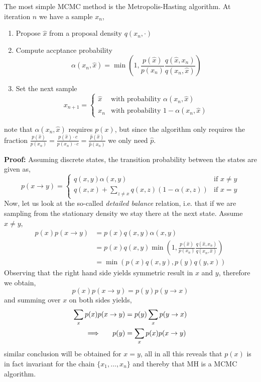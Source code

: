 \begin{testexample}
    The most simple MCMC method is the Metropolis-Hasting algorithm. At iteration
    $n$ we have a sample $x_n$,
    \begin{enumerate}
        \item Propose $\hat x$ from a proposal density $q(x_n,\cdot)$
        \item Compute accptance probability $$\alpha(x_n,\hat x) = \min \left(1, \frac{p(\hat x)}{p(x_n)} \frac{q(\hat x, x_n)}{q(x_n,\hat x)}\right)$$
        \item Set the next sample $$x_{n+1} = \begin{cases}
            \hat x &\text{with probability } \alpha(x_n, \hat x)\\
             x_n &\text{with probability } 1-\alpha(x_n, \hat x)
        \end{cases}$$
    \end{enumerate}
    note that $\alpha(x_n,\hat x)$ requires $p(x)$, but since the algorithm only
    requires the fraction $\frac{p(\hat x)}{p(x_n)} = \frac{p(\hat x)\cdot c}{p(x_n)\cdot c} = \frac{\hat p(\hat x)}{\hat p(x_n)}$
    we only need $\hat p$. 
    
    \textbf{Proof:} Assuming discrete states, the transition probability between the states are given as, 
    $$p(x\rightarrow y) = \begin{cases}
        q(x,y)\alpha(x,y) & \text{if } x\neq y\\
        q(x,x) + \sum_{z\neq x} q(x,z)(1-\alpha(x,z)) & \text{if } x=y
    \end{cases}$$
    Now, let us look at the so-called \textit{detailed balance} relation, i.e. that if we are sampling from the
    stationary density we stay there at the next state. Assume $x\neq y$, 
    \begin{align*}
        p(x)p(x\rightarrow y) &= p(x)q(x,y)\alpha(x,y)\\
        &=p(x)q(x,y) \min \left(1, \frac{p(\hat x)}{p(x_n)} \frac{q(\hat x, x_n)}{q(x_n,\hat x)}\right)\\
        &= \min(p(x)q(x,y), p(y)q(y,x))
    \end{align*}
    Observing that the right hand side yields symmetric result in $x$ and $y$, therefore we obtain, 
    $$p(x)p(x\rightarrow y) = p(y)p(y\rightarrow x)$$
    and summing over $x$ on both sides yields,
    \begin{align}
        \sum_x p(x)p(x\rightarrow y) &= p(y) \sum_x p(y\rightarrow x)\\
        \implies \hspace{0.5cm} p(y) &= \sum_x p(x)p(x\rightarrow y)
    \end{align}
    similar conclusion will be obtained for $x = y$, all in all this reveals that $p(x)$ is in fact invariant for the chain
     $\{x_1, \dots , x_n\}$ and thereby that MH is a MCMC algorithm. 
\end{testexample}

